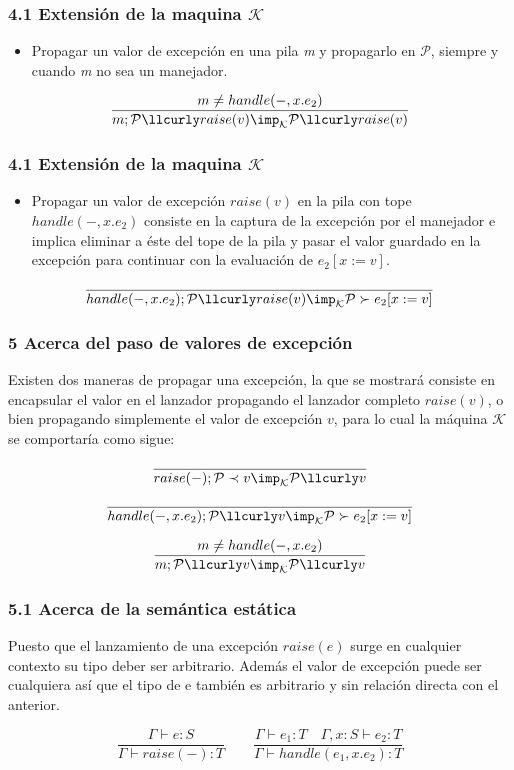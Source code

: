 \documentclass[xcolor=dvipsnames,table,spanish]{beamer}
\begin{document}
\begin{frame}
\frametitle{4.1 Extensión de la maquina $\mathcal{K}$}
\begin{itemize}
\item Propagar un valor de excepción en una pila \textit{m} y propagarlo en $\mathcal{P}$, siempre y cuando \textit{m} no sea un manejador.
\end{itemize}

\[\frac{m \neq handle(-,x.e_2)}{m; \mathcal{P} \llcurly raise(v) \imp_{\mathcal{K}} \mathcal{P} \llcurly raise(v)}\]

\end{frame}
\begin{frame}
\frametitle{4.1 Extensión de la maquina $\mathcal{K}$}
\begin{itemize}
\item Propagar un valor de excepción $raise(v)$ en la pila con tope $handle(-,x.e_2)$ consiste en la captura de la excepción por el manejador e implica eliminar a éste del tope de la pila y pasar el valor guardado en la excepción para continuar con la evaluación de $e_2[x:=v]$.
\end{itemize}

\[\frac{}{handle(-,x.e_2);\mathcal{P} \llcurly raise(v) \imp_{\mathcal{K}} \mathcal{P} \succ e_2[x:=v]}\]

\end{frame}
\begin{frame}
\frametitle{5 Acerca del paso de valores de excepción}
Existen dos maneras de propagar una excepción, la que se mostrará consiste en encapsular el valor en el lanzador propagando el lanzador completo $raise(v)$, o bien propagando simplemente el valor de excepción $v$, para lo cual la máquina $\mathcal{K}$ se comportaría como sigue:

\[\frac{}{raise(-); \mathcal{P} \prec v \imp_{\mathcal{K}} \mathcal{P} \llcurly v}\]

\[\frac{}{handle(-,x.e_2); \mathcal{P} \llcurly v \imp_{\mathcal{K}} \mathcal{P} \succ e_2[x:=v]}\]

\[\frac{m \neq handle(-,x.e_2)}{m; \mathcal{P} \llcurly v \imp_{\mathcal{K}} \mathcal{P} \llcurly v}\]
\end{frame}
\begin{frame}
\frametitle{5.1 Acerca de la semántica estática}
Puesto que el lanzamiento de una excepción $raise(e)$ surge en cualquier contexto su tipo deber ser arbitrario. Además el valor de excepción puede ser cualquiera así que el tipo de e también es arbitrario y sin relación directa con el anterior.

\[\frac{\Gamma \vdash e:S}{\Gamma \vdash raise(-):T} \qquad \frac{\Gamma \vdash e_1:T \quad \Gamma,x:S \vdash e_2:T}{\Gamma \vdash handle(e_1,x.e_2):T}\]
\end{frame}
\end{document}
